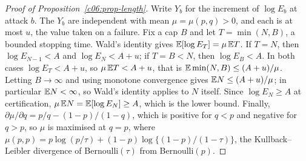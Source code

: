 \begin{proof}[Proof of Proposition~\ref{c06:prop-length}]
Write $Y_b$ for the increment of $\log E_b$ at attack $b$. The $Y_b$ are independent
with mean $\mu = \mu(p,q) > 0$, and each is at most $u$, the value taken on a
failure. Fix a cap $B$ and let $T = \min(N, B)$, a bounded stopping time. Wald's
identity gives $\mathbb{E}[\log E_T] = \mu\,\mathbb{E} T$. If $T = N$, then $\log E_{N-1} < A$ and
$\log E_N < A + u$; if $T = B < N$, then $\log E_B < A$. In both cases
$\log E_T < A + u$, so $\mu\,\mathbb{E} T < A + u$, that is $\mathbb{E}\min(N,B) \le (A+u)/\mu$.
Letting $B \to \infty$ and using monotone convergence gives $\mathbb{E} N \le (A+u)/\mu$; in
particular $\mathbb{E} N < \infty$, so Wald's identity applies to $N$ itself. Since
$\log E_N \ge A$ at certification, $\mu\,\mathbb{E} N = \mathbb{E}[\log E_N] \ge A$, which is the
lower bound. Finally, $\partial \mu / \partial q = p/q - (1-p)/(1-q)$, which is
positive for $q < p$ and negative for $q > p$, so $\mu$ is maximised at $q = p$,
where $\mu(p,p) = p\log(p/\tau) + (1-p)\log\{(1-p)/(1-\tau)\}$, the
Kullback--Leibler divergence of Bernoulli$(\tau)$ from Bernoulli$(p)$.
\end{proof}
